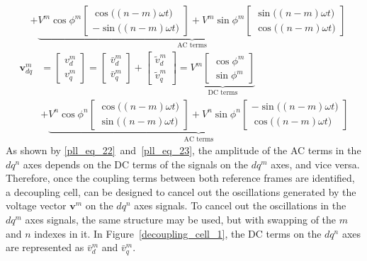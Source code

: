 \documentclass[11pt,a4paper,oneside]{book}
\numberwithin{equation}{section}
\theoremstyle{it}
\theoremstyle{definition}
\begin{document}
\begin{onehalfspace}
\begin{equation}
\begin{aligned}
		&+ \underbrace{V^m\cos\phi^m\begin{bmatrix} \cos\big((n-m)\omega t\big) \\[6pt] -\sin\big((n-m)\omega t\big) \end{bmatrix} + V^m\sin\phi^m\begin{bmatrix} \sin\big((n-m)\omega t\big) \\[6pt] \cos\big((n-m)\omega t\big) \end{bmatrix}}_{\text{AC terms}}
	\end{aligned}
\end{equation}
\begin{equation}\label{pll_eq_23}
	\begin{aligned}
		\boldsymbol{v}_{dq}^m &= \begin{bmatrix} v_d^m \\[6pt] v_q^m \end{bmatrix}=\begin{bmatrix} \bar{v}_d^m \\[6pt] \bar{v}_q^m 	\end{bmatrix} +\begin{bmatrix} \tilde{v}_d^m \\[6pt] \tilde{v}_q^m \end{bmatrix} = \underbrace{V^m\begin{bmatrix} \cos\phi^m \\[6pt] \sin\phi^m \end{bmatrix}}_{\text{DC terms}} \\[6pt]
		&+ \underbrace{V^n\cos\phi^n\begin{bmatrix} \cos\big((n-m)\omega t\big) \\[6pt] \sin\big((n-m)\omega t\big) \end{bmatrix} + V^n\sin\phi^n\begin{bmatrix} -\sin\big((n-m)\omega t\big) \\[6pt] \cos\big((n-m)\omega t\big) \end{bmatrix}}_{\text{AC terms}}
	\end{aligned}
\end{equation}
As shown by \eqref{pll_eq_22}~and~\eqref{pll_eq_23}, the amplitude of the AC terms in the $dq^n$ axes depends on the DC terms of the signals on the $dq^m$ axes, and vice versa. Therefore, once the coupling terms between both reference frames are identified, a decoupling cell, can be designed to cancel out the oscillations generated by the voltage vector $\boldsymbol{v}^m$ on the $dq^n$ axes signals. To cancel out the oscillations in the $dq^m$ axes signals, the same structure may be used, but with swapping of the $m$ and $n$ indexes in it. In Figure~\ref{decoupling_cell_1}, the DC terms on the $dq^n$ axes are represented as $\bar{v}_d^m$ and $\bar{v}_q^m$.


\end{onehalfspace}
\end{document}
